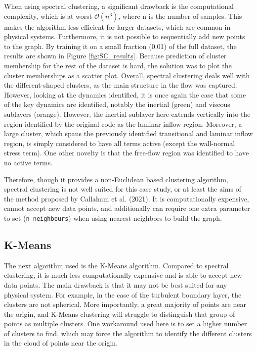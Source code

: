 \documentclass[12pt]{report} %
\begin{document}
When using spectral clustering, a significant drawback is the computational complexity, which is at worst $\mathcal{O}(n^3)$, where n is the number of samples. This makes the algorithm less efficient for larger datasets, which are common in physical systems. Furthermore, it is not possible to sequentially add new points to the graph. By training it on a small fraction (0.01) of the full dataset, the results are shown in Figure \ref{fig:SC_results}. Because prediction of cluster membership for the rest of the dataset is hard, the solution was to plot the cluster memberships as a scatter plot. Overall, spectral clustering deals well with the different-shaped clusters, as the main structure in the flow was captured. However, looking at the dynamics identified, it is once again the case that some of the key dynamics are identified, notably the inertial (green) and viscous sublayers (orange). However, the inertial sublayer here extends vertically into the region identified by the original code as the laminar inflow region. Moreover, a large cluster, which spans the previously identified transitional and laminar inflow region, is simply considered to have all terms active (except the wall-normal stress term). One other novelty is that the free-flow region was identified to have no active terms.

Therefore, though it provides a non-Euclidean based clustering algorithm, spectral clustering is not well suited for this case study, or at least the aims of the method proposed by Callaham et al. (2021)\cite{callaham2021learning}. It is computationally expensive, cannot accept new data points, and additionally can require one extra parameter to set (\texttt{n\_neighbours}) when using nearest neighbors to build the graph.


\subsection{K-Means}

The next algorithm used is the K-Means algorithm. Compared to spectral clustering, it is much less computationally expensive and is able to accept new data points. The main drawback is that it may not be best suited for any physical system. For example, in the case of the turbulent boundary layer, the clusters are not spherical. More importantly, a great majority of points are near the origin, and K-Means clustering will struggle to distinguish that group of points as multiple clusters. One workaround used here is to set a higher number of clusters to find, which may force the algorithm to identify the different clusters in the cloud of points near the origin.
\end{document}
